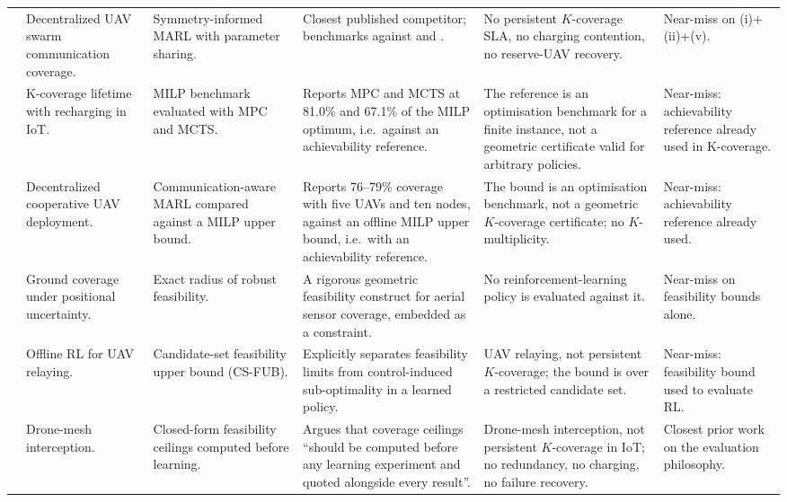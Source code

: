 \documentclass[conference]{IEEEtran}
\begin{document}
\begin{table}[t]
\begin{tabularx}{\textwidth}{@{}L{0.5cm}L{2.5cm}L{1.9cm}L{4.6cm}L{4.0cm}Y@{}}
\cite{shi2025} & Decentralized UAV swarm communication coverage. & Symmetry-informed MARL with parameter sharing. & Closest published competitor; benchmarks against \cite{liu2018} and \cite{yu2022}. & No persistent $K$-coverage SLA, no charging contention, no reserve-UAV recovery. & Near-miss on (i)+(ii)+(v). \\
\cite{song2024} & K-coverage lifetime with recharging in IoT. & MILP benchmark evaluated with MPC and MCTS. & Reports MPC and MCTS at 81.0\% and 67.1\% of the MILP optimum, i.e.\ against an achievability reference. & The reference is an optimisation benchmark for a finite instance, not a geometric certificate valid for arbitrary policies. & Near-miss: achievability reference already used in K-coverage. \\
\cite{fan2026} & Decentralized cooperative UAV deployment. & Communication-aware MARL compared against a MILP upper bound. & Reports 76--79\% coverage with five UAVs and ten nodes, against an offline MILP upper bound, i.e.\ with an achievability reference. & The bound is an optimisation benchmark, not a geometric $K$-coverage certificate; no $K$-multiplicity. & Near-miss: achievability reference already used. \\
\cite{datta2025} & Ground coverage under positional uncertainty. & Exact radius of robust feasibility. & A rigorous geometric feasibility construct for aerial sensor coverage, embedded as a constraint. & No reinforcement-learning policy is evaluated against it. & Near-miss on feasibility bounds alone. \\
\cite{viana2026} & Offline RL for UAV relaying. & Candidate-set feasibility upper bound (CS-FUB). & Explicitly separates feasibility limits from control-induced sub-optimality in a learned policy. & UAV relaying, not persistent $K$-coverage; the bound is over a restricted candidate set. & Near-miss: feasibility bound used to evaluate RL. \\
\cite{ceilings2026} & Drone-mesh interception. & Closed-form feasibility ceilings computed before learning. & Argues that coverage ceilings ``should be computed before any learning experiment and quoted alongside every result''. & Drone-mesh interception, not persistent $K$-coverage in IoT; no redundancy, no charging, no failure recovery. & Closest prior work on the evaluation philosophy. \\
\bottomrule
\end{tabularx}
\end{table}
\end{document}
